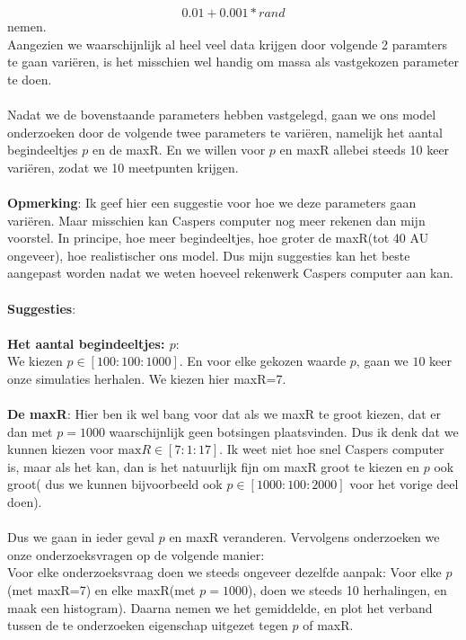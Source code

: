 \documentclass[11pt]{article}
\begin{document}
\[0.01+0.001*rand\] 
nemen.\\
Aangezien we waarschijnlijk al heel veel data krijgen door volgende 2 paramters te gaan vari\"{e}ren, is het misschien wel handig om massa als vastgekozen parameter te doen.\\
\\
Nadat we de bovenstaande parameters hebben vastgelegd, gaan we ons model onderzoeken door de volgende twee parameters te vari\"{e}ren, namelijk het aantal begindeeltjes $p$ en de maxR. En we willen voor $p$ en maxR allebei steeds 10 keer vari\"{e}ren, zodat we 10 meetpunten krijgen.\\
\\
\textbf{Opmerking}: Ik geef hier een suggestie voor hoe we deze parameters gaan vari\"{e}ren. Maar misschien kan Caspers computer nog meer rekenen dan mijn voorstel. In principe, hoe meer begindeeltjes, hoe groter de maxR(tot 40 AU ongeveer), hoe realistischer ons model. Dus mijn suggesties kan het beste aangepast worden nadat we weten hoeveel rekenwerk Caspers computer aan kan.\\
\\
\textbf{Suggesties}:\\
\\
\textbf{Het aantal begindeeltjes: $p$}: \\
We kiezen $p\in [100:100:1000]$. En voor elke gekozen waarde $p$, gaan we $10$ keer onze simulaties herhalen. We kiezen hier maxR=7.\\
\\
\textbf{De maxR}: Hier ben ik wel bang voor dat als we maxR te groot kiezen, dat er dan met $p=1000$ waarschijnlijk geen botsingen plaatsvinden. Dus ik denk dat we kunnen kiezen voor $\text{max}R\in [7:1:17]$. Ik weet niet hoe snel Caspers computer is, maar als het kan, dan is het natuurlijk fijn om maxR groot te kiezen en $p$ ook groot( dus we kunnen bijvoorbeeld ook $p\in [1000:100:2000]$ voor het vorige deel doen).\\
\\
Dus we gaan in ieder geval $p$ en maxR veranderen. Vervolgens onderzoeken we onze onderzoeksvragen op de volgende manier:\\
Voor elke onderzoeksvraag doen we steeds ongeveer dezelfde aanpak: Voor elke $p$(met maxR=7) en elke maxR(met $p=1000$), doen we steeds 10 herhalingen, en maak een histogram). Daarna nemen we het gemiddelde, en plot het verband tussen de te onderzoeken eigenschap uitgezet tegen $p$ of maxR.\\
\\
\end{document}
